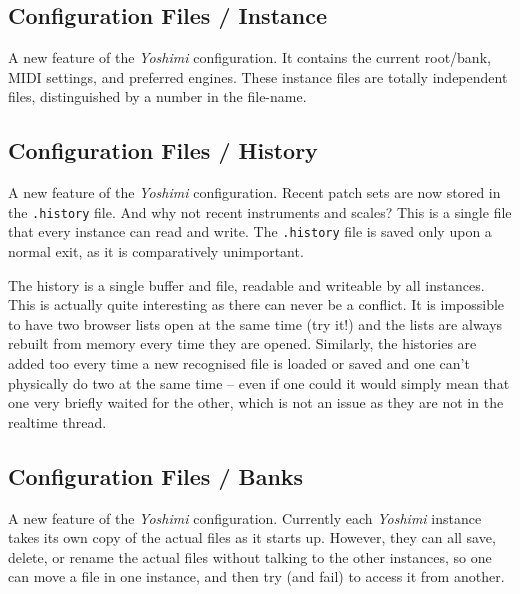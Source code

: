 \subsection{Configuration Files / Instance}
\label{subsec:configuration_instance}

   A new feature of the \textsl{Yoshimi} configuration.
   It contains the current root/bank, MIDI settings, and preferred engines.
   These instance files are totally independent files, distinguished by a number
   in the file-name.

\subsection{Configuration Files / History}
\label{subsec:configuration_history}

   A new feature of the \textsl{Yoshimi} configuration.
   Recent patch sets are now stored in the \texttt{.history} file.
   And why not recent instruments and scales?
   This is a single file that every instance can read and write.
   The \texttt{.history} file is saved only upon a normal exit, as it is
   comparatively unimportant.

   The history is a single buffer and file, readable and writeable by all
   instances. This is actually quite interesting as there can never be a
   conflict.  It is impossible to have two browser lists open at the same time
   (try it!) and the lists are always rebuilt from memory every time they are
   opened. Similarly, the histories are added too every time a new recognised
   file is loaded or saved and one can't physically do two at the same time --
   even if one could it would simply mean that one very briefly waited for the
   other, which is not an issue as they are not in the realtime thread.

\subsection{Configuration Files / Banks}
\label{subsec:configuration_banks}

   A new feature of the \textsl{Yoshimi} configuration.  Currently each
   \textsl{Yoshimi} instance takes its own copy of the actual files as it starts
   up.  However, they can all save, delete, or rename the actual files without
   talking to the other instances, so one can move a file in one instance, and
   then try (and fail) to access it from another.

